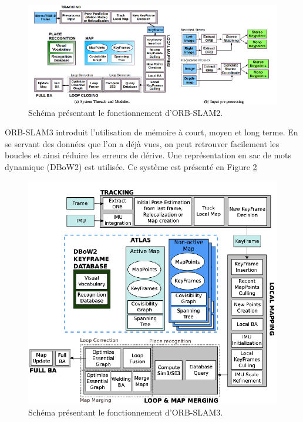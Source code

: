 \documentclass[11pt]{article}
\begin{document}
          \begin{figure}[hbt]  
            \includegraphics[width=\textwidth]{ORB_SLAM2.png}    
            \caption{Schéma présentant le fonctionnement d'ORB-SLAM2.}
            \label{fig:ORBSLAM2}
          \end{figure} 

          ORB-SLAM3 introduit l'utilisation de mémoire à court, moyen et long terme.
          En se servant des données que l'on a déjà vues, on peut retrouver
          facilement les boucles et ainsi réduire les erreurs de dérive. Une représentation en sac de mots dynamique (DBoW2) est utilisée.
          Ce système est présenté en Figure \ref{fig:ORBSLAM3}

          \begin{figure}[hbt]  
            \includegraphics[width=\textwidth]{ORB_SLAM3.png}    
            \caption{Schéma présentant le fonctionnement d'ORB-SLAM3.}
            \label{fig:ORBSLAM3}
          \end{figure} 
\end{document}
